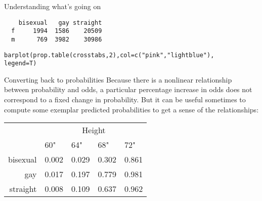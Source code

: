 \documentclass{beamer}\usepackage[]{graphicx}\usepackage[]{color}
\makeatletter
\newcommand{\hlnum}[1]{\textcolor[rgb]{0.824,0.412,0.118}{#1}}%
\newcommand{\hlstr}[1]{\textcolor[rgb]{1,0.894,0.71}{#1}}%
\newcommand{\hlstd}[1]{\textcolor[rgb]{1,0.894,0.769}{#1}}%
\newcommand{\hlkwc}[1]{\textcolor[rgb]{0.78,0.941,0.545}{#1}}%
\newcommand{\hlkwd}[1]{\textcolor[rgb]{1,0.78,0.769}{#1}}%
\newenvironment{kframe}{%
 \def\at@end@of@kframe{}%
 \ifinner\ifhmode%
  \def\at@end@of@kframe{\end{minipage}}%
  \begin{minipage}{\columnwidth}%
 \fi\fi%
 \def\FrameCommand##1{\hskip\@totalleftmargin \hskip-\fboxsep
 \colorbox{shadecolor}{##1}\hskip-\fboxsep
     \hskip-\linewidth \hskip-\@totalleftmargin \hskip\columnwidth}%
 \MakeFramed {\advance\hsize-\width
   \@totalleftmargin\z@ \linewidth\hsize
   \@setminipage}}%
 {\par\unskip\endMakeFramed%
 \at@end@of@kframe}
\newenvironment{knitrout}{}{} %
\makeatother
\begin{document}
\begin{darkframes}
\begin{frame}[fragile]{Understanding what's going on}
\begin{knitrout}
\begin{kframe}
\begin{verbatim}
    bisexual   gay straight
  f     1994  1586    20509
  m      769  3982    30986
\end{verbatim}
\end{kframe}
\end{knitrout}
    \end{frame}

    \begin{frame}[fragile]
      \fontsm
\begin{knitrout}
\begin{kframe}
\begin{alltt}
\hlkwd{barplot}\hlstd{(}\hlkwd{prop.table}\hlstd{(crosstabs,} \hlnum{2}\hlstd{),} \hlkwc{col}\hlstd{=}\hlkwd{c}\hlstd{(}\hlstr{"pink"}\hlstd{,} \hlstr{"lightblue"}\hlstd{),}
  \hlkwc{legend}\hlstd{=T)}
\end{alltt}
\end{kframe}


\end{knitrout}
    \end{frame}

    \begin{frame}{Converting back to probabilities}
      Because there is a nonlinear relationship between probability and odds, a particular percentage increase in odds does not correspond to a fixed change in probability. But it can be useful sometimes to compute some exemplar predicted probabilities to get a sense of the relationships:

      

      \begin{center}
        \begin{tabular}{r|llll}
          & \multicolumn{4}{c}{Height} \\
          & 60" & 64" & 68" & 72" \\
          \hline
          bisexual
            & 0.002
            & 0.029
            & 0.302
            & 0.861
            \\
          gay
            & 0.017
            & 0.197
            & 0.779
            & 0.981
            \\
          straight
            & 0.008
            & 0.109
            & 0.637
            & 0.962
            \\
        \end{tabular}
      \end{center}
    \end{frame}


\end{darkframes}
\end{document}
